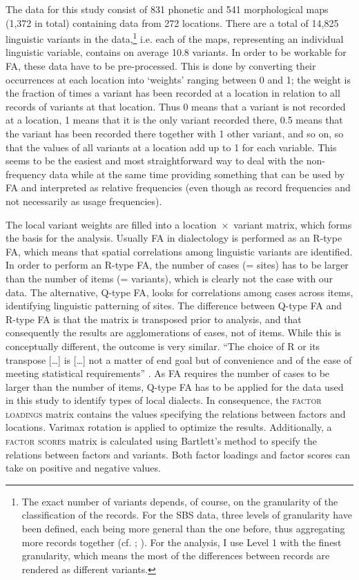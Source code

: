 \documentclass[output=paper]{LSP/langsci}
\begin{document}
The data for this study consist of 831 phonetic and 541 morphological maps (1,372 in total) containing data from 272 locations. There are a total of 14,825 linguistic variants in the data,\footnote{The exact number of variants depends, of course, on the granularity of the classification of the records. For the SBS data, three levels of granularity have been defined, each being more general than the one before, thus aggregating more records together (cf. \citealt[75--78]{pickl_probabilistische_2013}; \citealt[47--48]{proll_raumvariation_2015}). For the analysis, I use Level 1 with the finest granularity, which means the most of the differences between records are rendered as different variants.} i.e. each of the maps, representing an individual linguistic variable, contains on average 10.8 variants. In order to be workable for FA, these data have to be pre-processed. This is done by converting their occurrences at each location into ‘weights’ ranging between 0 and 1; the weight is the fraction of times a variant has been recorded at a location in relation to all records of variants at that location. Thus 0 means that a variant is not recorded at a location, 1 means that it is the only variant recorded there, 0.5 means that the variant has been recorded there together with 1 other variant, and so on, so that the values of all variants at a location add up to 1 for each variable. This seems to be the easiest and most straightforward way to deal with the non-frequency data while at the same time providing something that can be used by FA and interpreted as relative frequencies (even though as record frequencies and not necessarily as usage frequencies). 

The local variant weights are filled into a location~×~variant matrix, which forms the basis for the analysis. Usually FA in dialectology is performed as an R-type FA, which means that spatial correlations among linguistic variants are identified. In order to perform an R-type FA, the number of cases (= sites) has to be larger than the number of items (= variants), which is clearly not the case with our data. The alternative, Q-type FA, looks for correlations among cases across items, identifying linguistic patterning of sites. The difference between Q-type FA and R-type FA is that the matrix is transposed prior to analysis, and that consequently the results are agglomerations of cases, not of items. While this is conceptually different, the outcome is very similar. “The choice of R or its transpose […] is […] not a matter of end goal but of convenience and of the ease of meeting statistical requirements” \citep[326]{cattell_scientific_1978}. As FA requires the number of cases to be larger than the number of items, Q-type FA has to be applied for the data used in this study to identify types of local dialects. In consequence, the \textsc{factor loadings} matrix contains the values specifying the relations between factors and locations. Varimax rotation is applied to optimize the results. Additionally, a \textsc{factor scores} matrix is calculated using Bartlett’s method to specify the relations between factors and variants. Both factor loadings and factor scores can take on positive and negative values.
\end{document}
